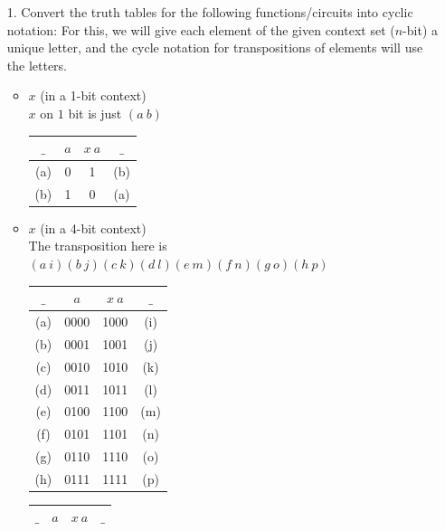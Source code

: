 \documentclass[11pt]{article}
\begin{document}
\begin{enumerate}

\item[1.] Convert the truth tables for the following functions/circuits into cyclic notation:
	For this, we will give each element of the given context set ($n$-bit) a unique letter,
		and the cycle notation for  transpositions of elements will use the letters.
	\begin{itemize}

	\item $x$ (in a 1-bit context) \\
	$x$ on $1$ bit is just $(a\ b)$ \\

	\begin{tabular}{c|c|c|c}
		$\_$ & $a$ & $x\ a$ & $\_$ \\
	\hline
		(a) & 0 & 1 & (b) \\
	\hline
		(b) & 1 & 0 & (a)
	\end{tabular}
	\vspace{.3in}
	\item $x$ (in a 4-bit context) \\
	The transposition here is $(a\ i) (b\ j) (c\ k) (d\ l) (e\ m) (f\ n) (g\ o) (h\ p)$ \\

	\begin{tabular}{c|c|c|c}
		$\_$ & $a$ & $x\ a$ & $\_$ \\
	\hline
		(a) & 0000 & 1000 & (i)  \\
	\hline                             
		(b) & 0001 & 1001 & (j)  \\
	\hline                             
		(c) & 0010 & 1010 & (k)  \\
	\hline                             
		(d) & 0011 & 1011 & (l)  \\
	\hline                             
		(e) & 0100 & 1100 & (m)  \\
	\hline                             
		(f) & 0101 & 1101 & (n)  \\
	\hline                             
		(g) & 0110 & 1110 & (o)  \\
	\hline                             
		(h) & 0111 & 1111 & (p)  \\
	\hline
	\end{tabular}
			\quad
	\begin{tabular}{c|c|c|c}
		$\_$ & $a$ & $x\ a$ & $\_$ \\
	\hline
	

\end{tabular}
\end{itemize}
\end{enumerate}
\end{document}

